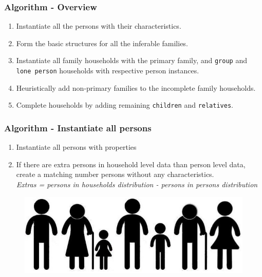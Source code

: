 \begin{frame}%
  \frametitle{Algorithm - Overview}%
  \begin{enumerate}
        \setlength\itemsep{1em}%
        \item Instantiate all the persons with their characteristics. %
        \item Form the basic structures for all the inferable families. %
        \item Instantiate all family households with the primary family, and
        \texttt{group} and \texttt{lone person} households with respective
        person instances.%
        \item Heuristically add non-primary families to the incomplete family
        households.%
        \item Complete households by adding remaining \texttt{children} and
        \texttt{relatives}.%
  \end{enumerate}%
\end{frame}
      
\begin{frame}%
  \frametitle{Algorithm - Instantiate all persons} \begin{enumerate}%
    \setlength\itemsep{1em}%
    \item Instantiate all persons with properties%
    \item If there are extra persons in household level data than person level
    data, create a matching number persons without any characteristics.\\[5pt]%
    \textit{Extras = persons in households distribution - persons in persons
      distribution}%
  	\seti
  \end{enumerate}%
  \begin{figure}
\centering
\includegraphics[scale=0.3]{images/form-persons}
\label{fig:form-persons}
\end{figure}

\end{frame}
      

